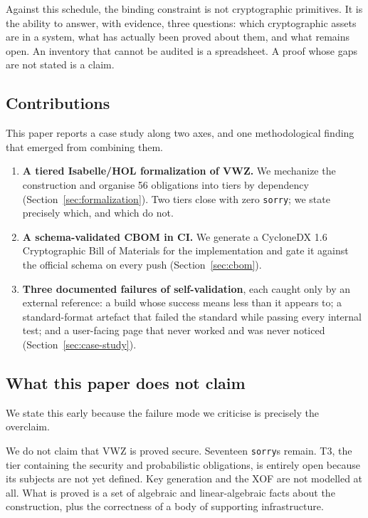 Against this schedule, the binding constraint is not cryptographic primitives.
It is the ability to answer, with evidence, three questions: which cryptographic
assets are in a system, what has actually been proved about them, and what
remains open. An inventory that cannot be audited is a spreadsheet. A proof
whose gaps are not stated is a claim.

\subsection{Contributions}

This paper reports a case study along two axes, and one methodological finding
that emerged from combining them.

\begin{enumerate}[leftmargin=*]
  \item \textbf{A tiered Isabelle/HOL formalization of VWZ.} We mechanize the
        construction and organise 56 obligations into tiers by dependency
        (Section~\ref{sec:formalization}). Two tiers close with zero
        \texttt{sorry}; we state precisely which, and which do not.

  \item \textbf{A schema-validated CBOM in CI.} We generate a CycloneDX 1.6
        Cryptographic Bill of Materials for the implementation and gate it
        against the official schema on every push (Section~\ref{sec:cbom}).

  \item \textbf{Three documented failures of self-validation}, each caught only
        by an external reference: a build whose success means less than it
        appears to; a standard-format artefact that failed the standard while
        passing every internal test; and a user-facing page that never worked
        and was never noticed (Section~\ref{sec:case-study}).
\end{enumerate}

\subsection{What this paper does not claim}

We state this early because the failure mode we criticise is precisely the
overclaim.

We do not claim that VWZ is proved secure. Seventeen \texttt{sorry}s remain.
T3, the tier containing the security and probabilistic obligations, is entirely
open because its subjects are not yet defined. Key generation and the XOF are
not modelled at all. What is proved is a set of algebraic and linear-algebraic
facts about the construction, plus the correctness of a body of supporting
infrastructure.

